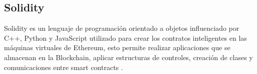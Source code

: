 \subsection{Solidity}
Solidity es un lenguaje de programación orientado a objetos influenciado  por
C++, Python y JavaScript utilizado para crear los contratos inteligentes en las máquinas virtuales de Ethereum,
esto permite realizar aplicaciones que se almacenan en la Blockchain, aplicar estructuras de controles, creación de clases y comunicaciones entre smart contracts \cite[]{dannen_introducing_2017,ethereum_solidity_nodate}.





